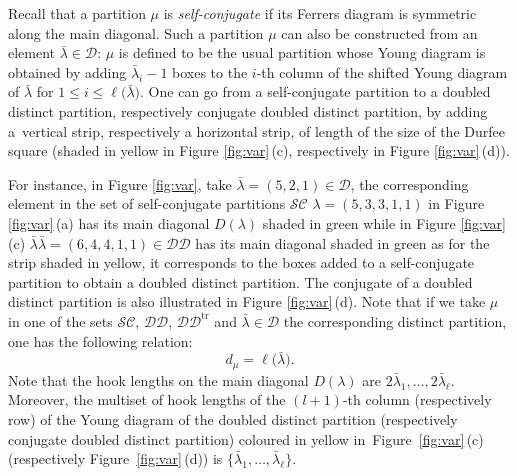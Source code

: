 \documentclass[10pt,a4paper]{amsart}
\numberwithin{equation}{section}
\def\ccsc{\mathcal {SC}}
\def\ccdd{\mathcal {DD}}
\def\ccd{\mathcal {D}}
\begin{document}
  Recall that a partition $\mu$ is \textit{self-conjugate} if its Ferrers diagram is symmetric along the main diagonal. Such a partition $\mu$ can also be constructed from an element $\bar{\lambda}\in\ccd$: $\mu$ is defined to be the usual partition whose Young diagram is obtained by adding $\bar{\lambda}_i-1$ boxes to the $i$-th column of the shifted Young diagram of $\bar{\lambda}$ for $1\leq i\leq \ell\bigl(\bar{\lambda}\bigr)$. One can go from a self-conjugate partition to a doubled distinct partition, respectively conjugate doubled distinct partition, by adding a~vertical strip, respectively a horizontal strip, of length of the size of the Durfee square (shaded in yellow in Figure \ref{fig:var}\,(c), respectively in Figure \ref{fig:var}\,(d)).

   For instance, in Figure \ref{fig:var}, take $\bar{\lambda}=(5,2,1)\in \ccd$, the corresponding element in the set of self-conjugate partitions $\ccsc$ $\lambda=(5,3,3,1,1)$ in Figure \ref{fig:var}\,(a) has its main diagonal $D(\lambda)$ shaded in green while in Figure \ref{fig:var}\,(c) $\bar{\lambda}\bar{\lambda}=(6,4,4,1,1)\in\ccdd$ has its main diagonal shaded in green as for the strip shaded in yellow, it corresponds to the boxes added to a self-conjugate partition to obtain a doubled distinct partition. The conjugate of a doubled distinct partition is also illustrated in Figure \ref{fig:var}\,(d). Note that if we take $\mu$ in one of the sets $\ccsc$, $\ccdd$, $\ccdd^{\mathrm{tr}}$ and $\bar{\lambda}\in\ccd$ the corresponding distinct partition, one has the following relation:
\begin{equation*}%
 d_\mu=\ell\bigl(\bar{\lambda}\bigr).
 \end{equation*}
Note that the hook lengths on the main diagonal $D(\lambda)$ are $ 2 \bar{\lambda}_1,\dots,2\bar{\lambda}_\ell$. Moreover, the multiset of hook lengths of the $(l+1)$-th column (respectively row) of the Young diagram of the doubled distinct partition (respectively conjugate doubled distinct partition) coloured in yellow in~Figure~\ref{fig:var}\,(c) (respectively Figure~\ref{fig:var}\,(d)) is $\bigl\lbrace \bar{\lambda}_1,\dots,\bar{\lambda}_\ell\bigr\rbrace$.
\end{document}
